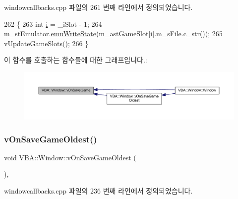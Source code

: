 windowcallbacks.\+cpp 파일의 261 번째 라인에서 정의되었습니다.


\begin{DoxyCode}
262 \{
263   \textcolor{keywordtype}{int} \mbox{\hyperlink{expr-lex_8cpp_acb559820d9ca11295b4500f179ef6392}{i}} = \_iSlot - 1;
264   m\_stEmulator.\mbox{\hyperlink{struct_emulated_system_a649c6ceaabee941f263a32fa8a73a9c5}{emuWriteState}}(m\_astGameSlot[\mbox{\hyperlink{expr-lex_8cpp_acb559820d9ca11295b4500f179ef6392}{i}}].m\_sFile.c\_str());
265   vUpdateGameSlots();
266 \}
\end{DoxyCode}
이 함수를 호출하는 함수들에 대한 그래프입니다.\+:
\nopagebreak
\begin{figure}[H]
\begin{center}
\leavevmode
\includegraphics[width=350pt]{class_v_b_a_1_1_window_aa614f13101a25febb6f3c3805c947e3e_icgraph}
\end{center}
\end{figure}
\mbox{\label{class_v_b_a_1_1_window_ac582c9416136eaaf39469fc9eff83fee}} 
\subsubsection{\texorpdfstring{v\+On\+Save\+Game\+Oldest()}{vOnSaveGameOldest()}}
{\footnotesize\ttfamily void V\+B\+A\+::\+Window\+::v\+On\+Save\+Game\+Oldest (\begin{DoxyParamCaption}{ }\end{DoxyParamCaption})\hspace{0.3cm}{\ttfamily [protected]}, {\ttfamily [virtual]}}



windowcallbacks.\+cpp 파일의 236 번째 라인에서 정의되었습니다.


